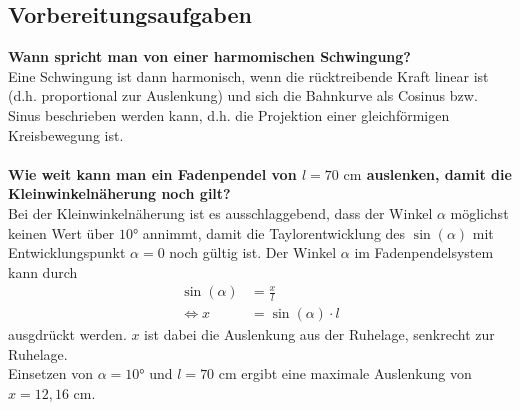 \subsection{Vorbereitungsaufgaben}
\label{sec:Vorbereitungsaufgaben}
\textbf{Wann spricht man von einer harmomischen Schwingung?}\\
Eine Schwingung ist dann harmonisch, wenn die rücktreibende Kraft linear ist (d.h. proportional zur Auslenkung) und sich die Bahnkurve als 
Cosinus bzw. Sinus beschrieben werden kann, d.h. die Projektion einer gleichförmigen Kreisbewegung ist. 
\\
\\
\textbf{Wie weit kann man ein Fadenpendel von $l = 70 \,\,\unit{\centi\meter}$ auslenken, damit die Kleinwinkelnäherung noch gilt?}\\
Bei der Kleinwinkelnäherung ist es ausschlaggebend, dass der Winkel $\alpha$ möglichst keinen Wert über $10°$ annimmt, 
damit die Taylorentwicklung des $\sin(\alpha)$ mit Entwicklungspunkt $\alpha = 0$ noch gültig ist. 
Der Winkel $\alpha$ im Fadenpendelsystem kann durch
\begin{align}
    \sin(\alpha) &= \frac{x}{l} \\
    \Leftrightarrow x &= \sin(\alpha) \cdot l
\end{align}
ausgdrückt werden. $x$ ist dabei die Auslenkung aus der Ruhelage, senkrecht zur Ruhelage. \\
Einsetzen von $\alpha = 10°$ und $l = 70 \,\, \unit{\centi\meter}$ ergibt eine maximale Auslenkung von $x = 12,16 \,\, \unit{\centi\meter}$. 